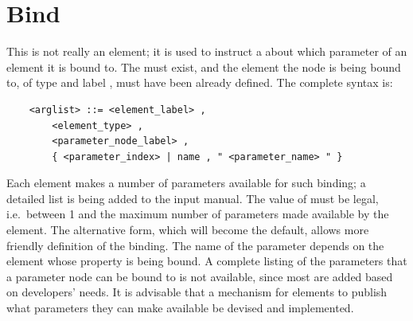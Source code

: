 \section{Bind}\label{sec:EL:BIND}
This is not really an element; it is used to instruct a 
about which parameter of an element it is bound to.
The  must exist, and the element the node 
is being bound to, of type  and label ,
must have been already defined.
The complete syntax is:
\begin{verbatim}
    <arglist> ::= <element_label> , 
        <element_type> ,
        <parameter_node_label> , 
        { <parameter_index> | name , " <parameter_name> " }
\end{verbatim}
Each element makes a number of parameters available for such binding; a
detailed list is being added to the input manual.
The value of  must be legal, i.e.\ between 1 and the
maximum number of parameters made available by the element.
The alternative form, which will become the default, allows more
friendly definition of the binding.
The name of the parameter depends on the element whose property
is being bound.
A complete listing of the parameters that a parameter node 
can be bound to is not available, since most are added based
on developers' needs.
It is advisable that a mechanism for elements to publish 
what parameters they can make available be devised and implemented.

